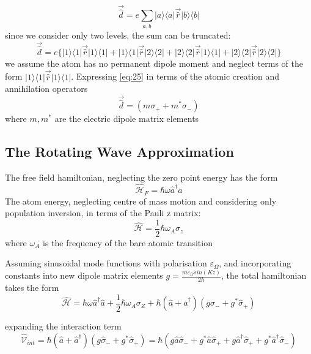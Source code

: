 \documentclass[reqno]{amsart}
\newcommand{\ham}{\hat{\mathscr{H}}}
\newcommand{\cre}{\hat{a}^\dagger}
\newcommand{\ann}{\hat{a}}
\newcommand{\atann}{\hat{\sigma}_-}
\newcommand{\atcre}{\hat{\sigma}_+}
\begin{document}
\begin{equation}
	\vec{\hat{d}} = e \sum_{a, b} | a \rangle \langle a | \vec{\hat{r} }| b \rangle \langle b |
\end{equation}
since we consider only two levels, the sum can be truncated: 
\begin{equation}
	\vec{\hat{d}} = e\{| 1 \rangle \langle 1|\vec{\hat{r}} | 1 \rangle \langle 1 | + | 1 \rangle \langle 1|\vec{\hat{r}} | 2 \rangle \langle 2 | + | 2 \rangle \langle 2|\vec{\hat{r}} | 1 \rangle \langle 1 | + | 2 \rangle \langle 2|\vec{\hat{r}} | 2 \rangle \langle 2 | \}
\label{eq:25}
\end{equation}
we assume the atom has no permanent dipole moment and neglect terms of the form $| 1 \rangle \langle 1|\vec{\hat{r}} | 1 \rangle \langle 1 |$. Expressing \ref{eq:25} in terms of the atomic creation and annihilation operators
\begin{equation}
	\vec{\hat{d}} = (m\sigma_+ + m^* \sigma_-)
\end{equation}
where $m, m^*$ are the electric dipole matrix elements
\subsection{The Rotating Wave Approximation}
The free field hamiltonian, neglecting the zero point energy has the form
\begin{equation}
	\ham_F =  \hbar \omega \cre \ann
\end{equation}
The atom energy, neglecting centre of mass motion and considering only population inversion, in terms of the Pauli z matrix:
\begin{equation}
	\ham = \frac {1} {2} \hbar \omega_A \sigma_z
\end{equation}
where $\omega_A$ is the frequency of the bare atomic transition

Assuming sinusoidal mode functions with polarisation $\varepsilon_\Omega$, and incorporating constants into new dipole matrix elements $g = \frac{m \varepsilon_\Omega sin(Kz)} {2 \hbar}$, the total hamiltonian takes the form 
\begin{equation}
	\ham = \hbar \omega \cre \hat{a} +\frac{1}{2} \hbar \omega_A \sigma_Z + \hbar (\ann +\cre)(g\atann+g^*\atcre)
\end{equation}

expanding the interaction term
\begin{equation}
	\hat{\mathscr{V}}_{int} = \hbar (\ann +\cre)(g\atann+g^*\atcre) =  \hbar (g \ann \atann + g^* \ann \atcre + g \cre \atcre +g^* \cre\atann)
\end{equation}
\end{document}
